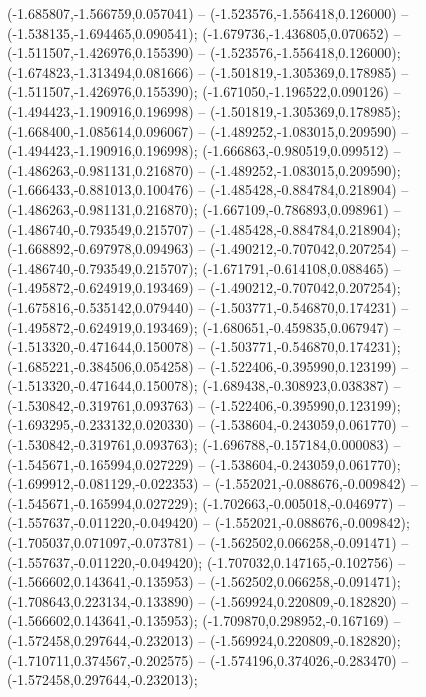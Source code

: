  (-1.685807,-1.566759,0.057041) -- (-1.523576,-1.556418,0.126000) -- (-1.538135,-1.694465,0.090541);
 (-1.679736,-1.436805,0.070652) -- (-1.511507,-1.426976,0.155390) -- (-1.523576,-1.556418,0.126000);
 (-1.674823,-1.313494,0.081666) -- (-1.501819,-1.305369,0.178985) -- (-1.511507,-1.426976,0.155390);
 (-1.671050,-1.196522,0.090126) -- (-1.494423,-1.190916,0.196998) -- (-1.501819,-1.305369,0.178985);
 (-1.668400,-1.085614,0.096067) -- (-1.489252,-1.083015,0.209590) -- (-1.494423,-1.190916,0.196998);
 (-1.666863,-0.980519,0.099512) -- (-1.486263,-0.981131,0.216870) -- (-1.489252,-1.083015,0.209590);
 (-1.666433,-0.881013,0.100476) -- (-1.485428,-0.884784,0.218904) -- (-1.486263,-0.981131,0.216870);
 (-1.667109,-0.786893,0.098961) -- (-1.486740,-0.793549,0.215707) -- (-1.485428,-0.884784,0.218904);
 (-1.668892,-0.697978,0.094963) -- (-1.490212,-0.707042,0.207254) -- (-1.486740,-0.793549,0.215707);
 (-1.671791,-0.614108,0.088465) -- (-1.495872,-0.624919,0.193469) -- (-1.490212,-0.707042,0.207254);
 (-1.675816,-0.535142,0.079440) -- (-1.503771,-0.546870,0.174231) -- (-1.495872,-0.624919,0.193469);
 (-1.680651,-0.459835,0.067947) -- (-1.513320,-0.471644,0.150078) -- (-1.503771,-0.546870,0.174231);
 (-1.685221,-0.384506,0.054258) -- (-1.522406,-0.395990,0.123199) -- (-1.513320,-0.471644,0.150078);
 (-1.689438,-0.308923,0.038387) -- (-1.530842,-0.319761,0.093763) -- (-1.522406,-0.395990,0.123199);
 (-1.693295,-0.233132,0.020330) -- (-1.538604,-0.243059,0.061770) -- (-1.530842,-0.319761,0.093763);
 (-1.696788,-0.157184,0.000083) -- (-1.545671,-0.165994,0.027229) -- (-1.538604,-0.243059,0.061770);
 (-1.699912,-0.081129,-0.022353) -- (-1.552021,-0.088676,-0.009842) -- (-1.545671,-0.165994,0.027229);
 (-1.702663,-0.005018,-0.046977) -- (-1.557637,-0.011220,-0.049420) -- (-1.552021,-0.088676,-0.009842);
 (-1.705037,0.071097,-0.073781) -- (-1.562502,0.066258,-0.091471) -- (-1.557637,-0.011220,-0.049420);
 (-1.707032,0.147165,-0.102756) -- (-1.566602,0.143641,-0.135953) -- (-1.562502,0.066258,-0.091471);
 (-1.708643,0.223134,-0.133890) -- (-1.569924,0.220809,-0.182820) -- (-1.566602,0.143641,-0.135953);
 (-1.709870,0.298952,-0.167169) -- (-1.572458,0.297644,-0.232013) -- (-1.569924,0.220809,-0.182820);
 (-1.710711,0.374567,-0.202575) -- (-1.574196,0.374026,-0.283470) -- (-1.572458,0.297644,-0.232013);
